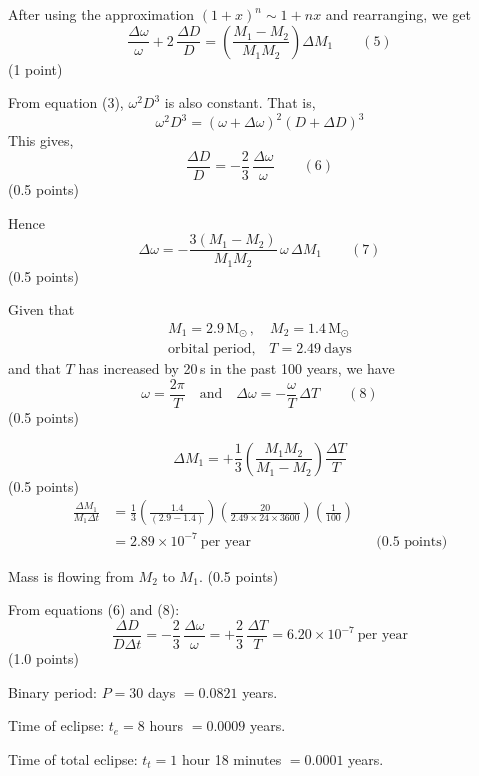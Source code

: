 \begin{description}
After using the approximation $(1+x)^n \sim 1 + nx$ and rearranging, we get
\[ \frac{\Delta\omega}{\omega} + 2\,\frac{\Delta D}{D}
   = \left(\frac{M_1 - M_2}{M_1 M_2}\right)\Delta M_1 \qquad (5) \]
\hfill(1 point)

From equation (3), $\omega^2 D^3$ is also constant. That is,
\[ \omega^2 D^3 = (\omega + \Delta\omega)^2 (D + \Delta D)^3 \]
This gives,
\[ \frac{\Delta D}{D} = -\frac{2}{3}\,\frac{\Delta\omega}{\omega}
   \qquad (6) \]
\hfill(0.5 points)

Hence
\[ \Delta\omega = -\frac{3\left(M_1 - M_2\right)}{M_1 M_2}\,
   \omega\,\Delta M_1 \qquad (7) \]
\hfill(0.5 points)

\item[d)] Given that
\begin{gather*}
M_1 = 2.9\,\mathrm{M}_\odot\,, \quad M_2 = 1.4\,\mathrm{M}_\odot \\
\text{orbital period,}\quad T = 2.49\ \text{days}
\end{gather*}
and that $T$ has increased by 20\,s in the past 100 years, we have
\[ \omega = \frac{2\pi}{T} \quad\text{and}\quad
   \Delta\omega = -\frac{\omega}{T}\,\Delta T \qquad (8) \]
\hfill(0.5 points)

\[ \Delta M_1 = +\frac{1}{3}\left(\frac{M_1 M_2}{M_1 - M_2}\right)
   \frac{\Delta T}{T} \]
\hfill(0.5 points)
\begin{align*}
\frac{\Delta M_1}{M_1 \Delta t}
  &= \frac{1}{3}\left(\frac{1.4}{(2.9 - 1.4)}\right)
     \left(\frac{20}{2.49 \times 24 \times 3600}\right)
     \left(\frac{1}{100}\right) \\
  &= 2.89 \times 10^{-7}\ \text{per year}
  && \text{(0.5 points)}
\end{align*}

\item[e)] Mass is flowing from $M_2$ to $M_1$. \hfill(0.5 points)

\item[f)] From equations (6) and (8):
\[ \frac{\Delta D}{D\Delta t} = -\frac{2}{3}\,\frac{\Delta\omega}{\omega}
   = +\frac{2}{3}\,\frac{\Delta T}{T}
   = 6.20 \times 10^{-7}\ \text{per year} \]
\hfill(1.0 points)
\end{description}


Binary period: $P = 30$ days $= 0.0821$ years.

Time of eclipse: $t_e = 8$ hours $= 0.0009$ years.

Time of total eclipse: $t_t = 1$ hour 18 minutes $= 0.0001$ years.


